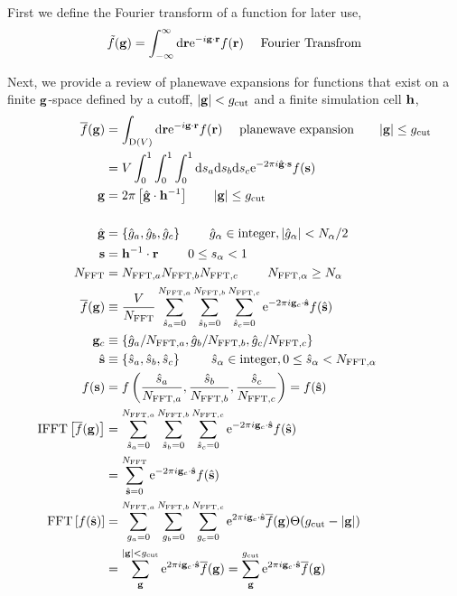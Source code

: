 \documentclass[paper=a4, fontsize=11pt]{article} %
\numberwithin{equation}{section} %
\numberwithin{figure}{section} %
\numberwithin{table}{section} %
\newcommand{\ol}{\overline}
\newcommand{\bh}{{\bf{h}}}
\newcommand{\bs}{{\bf{s}}}
\newcommand{\bg}{{\bf{g}}}
\newcommand{\br}{{\bf{r}}}
\newcommand{\hs}{{\hat{\bf{s}}}}
\newcommand{\rcut}{{\mathrm{cut}}}
\newcommand{\re}{{\mathrm{e}}}
\newcommand{\rd}{{\mathrm{d}}}
\newcommand{\rD}{{\mathrm{D}}}
\newcommand{\ibgr}{i\bg\cdot\br}
\newcommand{\al}{{\alpha}}
\newcommand{\NFFT}{{N_{\mathrm{FFT}}}}
\begin{document}
\newpage

First we define the Fourier transform of a function for later use,
\begin{equation}
\tilde f (\bg) = \int_{-\infty}^{\infty} \rd \br \re^{-\ibgr} f(\br)\ \ \ \ \mathrm{Fourier\ Transfrom} 
\end{equation}


Next, we provide a review of planewave expansions for functions that exist on a finite $\bg$-space defined by a cutoff, $|\bg| < g_\rcut$ and a finite simulation cell $\bh$,
\begin{equation}\label{eq:dict}
\begin{split}
\overline f (\bg) &= \int_{\rD(V)} \rd \br \re^{-\ibgr} f(\br) \ \ \ \ \mathrm{planewave\ expansion} \ \ \ \ \ \ |\bg| \leq g_\rcut \\
&= V\int_{0}^{1}\int_{0}^{1}\int_{0}^{1} \rd s_a\rd s_b\rd s_c \re^{-2 \pi i \hat\bg\cdot\bs}f(\bs) \\
\bg &= 2\pi\left[\hat\bg \cdot \bh^{-1}\right] \ \ \ \ \ \ |\bg| \leq g_\rcut \\  \\
\hat\bg &= \{\hat {g}_a, \hat {g}_b,\hat {g}_c\}\ \ \ \ \ \ \ \hat{g}_\alpha \in \mathrm{integer}, |\hat{g}_\alpha|< N_\alpha/2 \\
\bs &= \bh^{-1} \cdot \br \ \ \ \ \ \ \ 0 \leq s_\al < 1\\
\NFFT &= {N_{\mathrm{FFT},a}}{N_{\mathrm{FFT},b}}{N_{\mathrm{FFT},c}} \ \ \ \ \ \ \ N_{\mathrm{FFT},\alpha} \geq N_\alpha\\
\ol f(\bg)&\equiv \frac{V} {N_{\mathrm{FFT}}}\sum_{\hat s_a=0}^{N_{\mathrm{FFT},a}}\sum_{\hat s_b=0}^{N_{\mathrm{FFT},b}}\sum_{\hat s_c=0}^{N_{\mathrm{FFT},c}} \re^{-2\pi i \bg_c \cdot \hs} f(\hs) \\
\bg_c &\equiv \left\{\hat{g}_{a}/N_{\mathrm{FFT},a},\hat{g}_{b}/N_{\mathrm{FFT},b},\hat{g}_{c}/N_{\mathrm{FFT},c}\right\} \\
\hat \bs &\equiv \left\{\hat {s}_a,\hat {s}_b ,\hat {s}_c\right\} \ \ \ \ \ \ \ \hat{s}_\alpha \in \mathrm{integer}, 0 \leq \hat{s}_\alpha < N_{\mathrm{FFT},\alpha}\\
f(\bs) &= f\left(\frac{\hat{s}_a}{N_{\mathrm{FFT},a}},\frac{\hat{s}_b}{N_{\mathrm{FFT},b}},\frac{\hat{s}_c}{N_{\mathrm{FFT},c}}\right) = f(\hs) \\
\mathrm{IFFT}\left[\ol f(\bg)\right]&= \sum_{\hat s_a=0}^{N_{\mathrm{FFT},a}}\sum_{\hat s_b=0}^{N_{\mathrm{FFT},b}}\sum_{\hat s_c=0}^{N_{\mathrm{FFT},c}} \re^{-2\pi i \bg_c \cdot \hs} f(\hs)\\
&= \sum_{\hs=0}^\NFFT \re^{-2\pi i \bg_c \cdot \hs} f(\hs)\\
\mathrm{FFT}\left[f(\hs)\right]&= \sum_{g_a=0}^{N_{\mathrm{FFT},a}}\sum_{g_b=0}^{N_{\mathrm{FFT},b}}\sum_{g_c=0}^{N_{\mathrm{FFT},c}} \re^{2\pi i \bg_c \cdot \hs} \ol f(\bg) \Theta(g_{\rcut}-|\bg|)\\
&= \sum_{\bg}^{|\bg| < g_{\rcut}} \re^{2\pi i \bg_c \cdot \hs} \ol f(\bg) = \sum_{\bg}^{g_{\rcut}} \re^{2\pi i \bg_c \cdot \hs} \ol f(\bg)\\
\end{split}
\end{equation}
\end{document}

